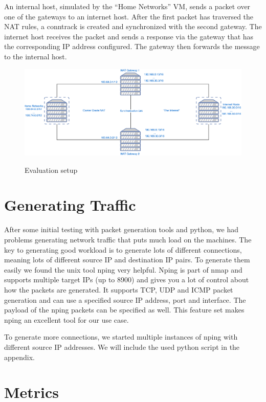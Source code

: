 \documentclass{report}
\begin{document}
An internal host, simulated by the ``Home Networks'' VM, sends a packet
over one of the gateways to an internet host. After the first packet has
traversed the NAT rules, a conntrack is created and synchronized with the
second gateway. The internet host receives the packet and sends a
response via the gateway that has the corresponding IP address
configured. The gateway then forwards the message to the internal host.

\begin{figure}[ht]
	\centering
	\includegraphics[width=\textwidth]{../EvaluationSetup.pdf}
	\label{EvaluationSetup.pdf}
	\caption{Evaluation setup}  
\end{figure}

\section{Generating Traffic}\label{generating-traffic}

After some initial testing with packet generation tools and python, we
had problems generating network traffic that puts much load on the
machines. The key to generating good workload is to generate lots of
different connections, meaning lots of different source IP and destination
IP pairs. To generate them easily we found the unix tool nping\cite{nping}
very helpful. Nping is part of nmap\cite{nmap} and supports multiple target
IPs (up to 8900) and gives you a lot of control about how the packets
are generated. It supports TCP, UDP and ICMP packet generation and can
use a specified source IP address, port and interface. The payload of
the nping packets can be specified as well. This feature set makes nping
an excellent tool for our use case.

To generate more connections, we started multiple instances of nping with
different source IP addresses. We will include the used python script in
the appendix.



\section{Metrics}\label{metrics}
\end{document}
